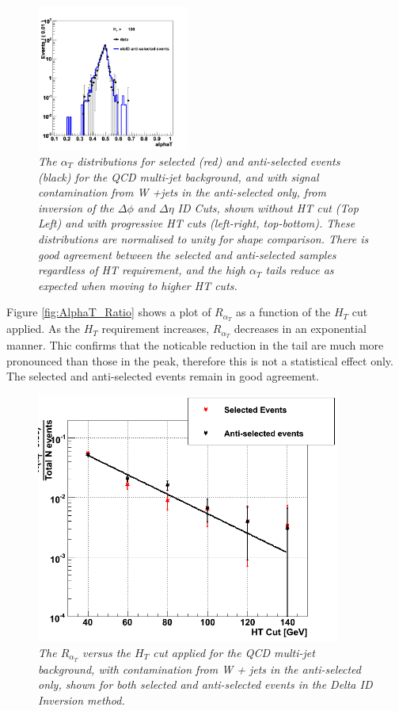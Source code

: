 \begin{figure}[h!]
\hspace*{3mm}
\includegraphics[width=50mm]{Plots/w-alphaT-6}
\caption{\textit{The $\alpha_{T}$ distributions for selected (red) and anti-selected events (black) for the QCD multi-jet background, and with signal contamination from W +jets in the anti-selected only, from inversion of the $\Delta \phi$ and $\Delta \eta$ ID Cuts, shown without HT cut (Top Left) and with progressive HT cuts (left-right, top-bottom). These distributions are normalised to unity for shape comparison. There is good agreement between the selected and anti-selected samples regardless of HT requirement, and the high $\alpha_{T}$ tails reduce as expected when moving to higher HT cuts.}}
\label{fig:w-AlphaTbyHT}
\end{figure}

 Figure \ref{fig:AlphaT_Ratio} shows a plot of $R_{\alpha_T}$ as a function of the $H_{T}$ cut applied. As the $H_{T}$ requirement increases, $R_{\alpha_T}$ decreases in an exponential manner. Thic confirms that the noticable reduction in the tail are much more pronounced than those in the peak, therefore this is not a statistical effect only. The selected and anti-selected events remain in good agreement.

\begin{figure}[h!]
\begin{center}
\includegraphics[width=100mm]{Plots/w-alphaTratio}
\end{center}
\caption{\textit{The $R_{\alpha_T}$ versus the $H_{T}$ cut applied for the QCD multi-jet background, with contamination from W + jets in the anti-selected only, shown for both selected and anti-selected events in the Delta ID Inversion method.}}
\label{fig:w-AlphaT_Ratio}
\end{figure}

